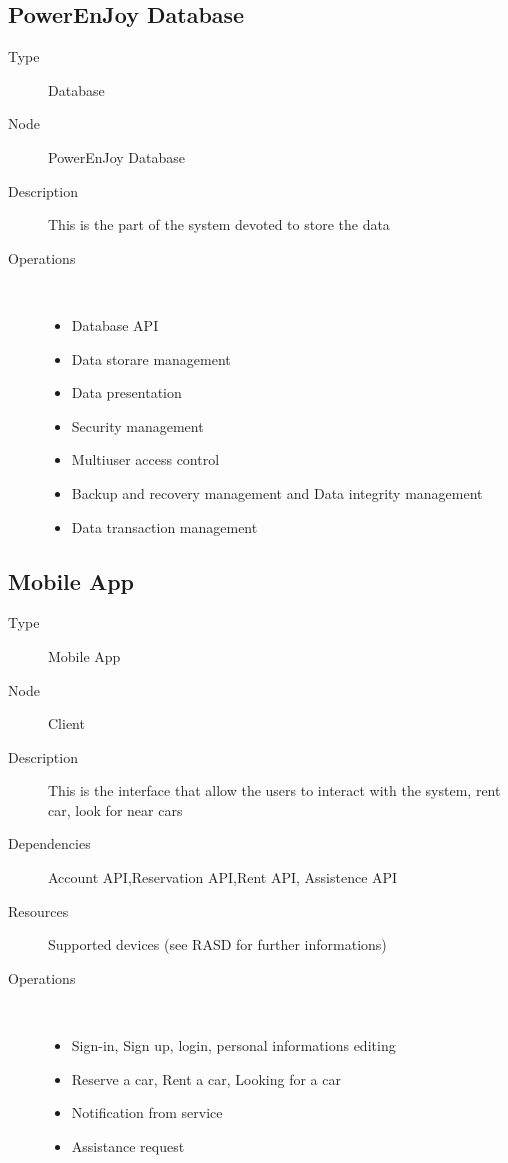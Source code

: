 \subsection{PowerEnJoy Database}
\begin{description}
	\item[Type] Database
	\item[Node] PowerEnJoy Database
	\item[Description] This is the part of the system devoted to store the data 
	\item[Operations] \ \\
		\begin{itemize}
			\item Database API
			\item Data storare management
			\item Data presentation
			\item Security management
			\item Multiuser access control
			\item Backup and recovery management and Data integrity management
			\item Data transaction management	
		\end{itemize}
\end{description}

\subsection{Mobile App}
\begin{description}
	\item[Type] Mobile App
	\item[Node] Client
	\item[Description] This is the interface that allow the users to interact with the system, rent car, look for near cars
	\item[Dependencies] Account API,Reservation API,Rent API, Assistence API
	\item[Resources] Supported devices (see RASD for further informations)
	\item[Operations] \ \\
		\begin{itemize}
			\item Sign-in, Sign up, login, personal informations editing
			\item Reserve a car, Rent a car, Looking for a car
			\item Notification from service
			\item Assistance request
	\end{itemize}
\end{description}

